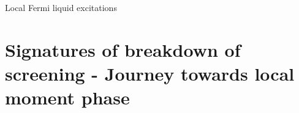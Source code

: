 \documentclass[aspectratio=169]{beamer}
\begin{document}
\begin{frame}[noframenumbering]{Local Fermi liquid excitations}
\begin{minipage}{0.4\textwidth}
\end{minipage}
\end{frame}

\section{Signatures of breakdown of screening - Journey towards local moment phase}
\end{document}
